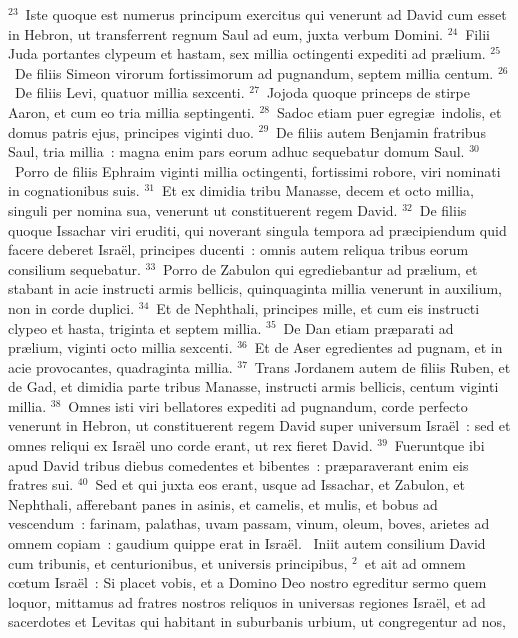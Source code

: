 ${}^{23}$~Iste quoque est numerus principum exercitus qui venerunt ad David cum esset in Hebron, ut transferrent regnum Saul ad eum, juxta verbum Domini.
${}^{24}$~Filii Juda portantes clypeum et hastam, sex millia octingenti expediti ad pr\ae lium.
${}^{25}$~De filiis Simeon virorum fortissimorum ad pugnandum, septem millia centum.
${}^{26}$~De filiis Levi, quatuor millia sexcenti.
${}^{27}$~Jojoda quoque princeps de stirpe Aaron, et cum eo tria millia septingenti.
${}^{28}$~Sadoc etiam puer egregi\ae\ indolis, et domus patris ejus, principes viginti duo.
${}^{29}$~De filiis autem Benjamin fratribus Saul, tria millia~: magna enim pars eorum adhuc sequebatur domum Saul.
${}^{30}$~Porro de filiis Ephraim viginti millia octingenti, fortissimi robore, viri nominati in cognationibus suis.
${}^{31}$~Et ex dimidia tribu Manasse, decem et octo millia, singuli per nomina sua, venerunt ut constituerent regem David.
${}^{32}$~De filiis quoque Issachar viri eruditi, qui noverant singula tempora ad pr\ae cipiendum quid facere deberet Isra\"el, principes ducenti~: omnis autem reliqua tribus eorum consilium sequebatur.
${}^{33}$~Porro de Zabulon qui egrediebantur ad pr\ae lium, et stabant in acie instructi armis bellicis, quinquaginta millia venerunt in auxilium, non in corde duplici.
${}^{34}$~Et de Nephthali, principes mille, et cum eis instructi clypeo et hasta, triginta et septem millia.
${}^{35}$~De Dan etiam pr\ae parati ad pr\ae lium, viginti octo millia sexcenti.
${}^{36}$~Et de Aser egredientes ad pugnam, et in acie provocantes, quadraginta millia.
${}^{37}$~Trans Jordanem autem de filiis Ruben, et de Gad, et dimidia parte tribus Manasse, instructi armis bellicis, centum viginti millia.
${}^{38}$~Omnes isti viri bellatores expediti ad pugnandum, corde perfecto venerunt in Hebron, ut constituerent regem David super universum Isra\"el~: sed et omnes reliqui ex Isra\"el uno corde erant, ut rex fieret David.
${}^{39}$~Fueruntque ibi apud David tribus diebus comedentes et bibentes~: pr\ae paraverant enim eis fratres sui.
${}^{40}$~Sed et qui juxta eos erant, usque ad Issachar, et Zabulon, et Nephthali, afferebant panes in asinis, et camelis, et mulis, et bobus ad vescendum~: farinam, palathas, uvam passam, vinum, oleum, boves, arietes ad omnem copiam~: gaudium quippe erat in Isra\"el.
~Iniit autem consilium David cum tribunis, et centurionibus, et universis principibus,
${}^{2}$~et ait ad omnem cœtum Isra\"el~: Si placet vobis, et a Domino Deo nostro egreditur sermo quem loquor, mittamus ad fratres nostros reliquos in universas regiones Isra\"el, et ad sacerdotes et Levitas qui habitant in suburbanis urbium, ut congregentur ad nos,
